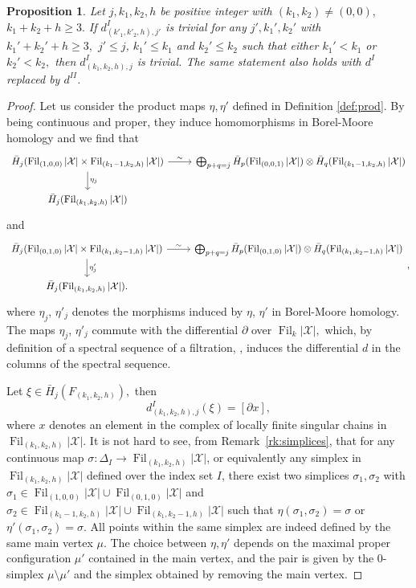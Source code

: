 \documentclass[10pt,a4paper,twoside]{amsart}
\theoremstyle{plain}
\newtheorem{prop}[theo]{Proposition}
\theoremstyle{definition}
\theoremstyle{remark}
\begin{document}
\begin{prop}\label{rkDiff2} 
Let $j,k_1,k_2,h$ be positive integer with $(k_1,k_2)\neq (0,0),$  $k_1+k_2+h\geq 3.$ 
If $d^{{I}}_{(k'_1,k'_2,h),j'}$ is trivial for any $j',k_1',k_2'$ with  $k_1'+k_2'+h\geq 3,$ $j'\leq j$,   $k_1'\leq k_1$ and $k_2'\leq k_2$ such that either $k_1'<k_1$ or $k_2'<k_2,$
then $d^{{I}}_{(k_1,k_2,h),j}$ is trivial.
The same statement also holds with $d^{{I}}$ replaced by $d^{{II}}$. 
\end{prop}
\begin{proof}
Let us consider the product maps $\eta,\eta'$ defined in Definition \ref{def:prod}. By being continuous and proper, they 
induce homomorphisms in Borel-Moore homology and we find that 
\[
\begin{tikzcd}
\bar{H}_{j}(\operatorname{Fil}_{{(1,0,0)}}|\mathcal{X}|\times \operatorname{Fil}_{{(k_1-1,k_2,h)}}|\mathcal{X}|)\arrow{d}{\eta_{j}}\arrow{r}{\sim}&\bigoplus_{p+q=j}\bar{H}_p(\operatorname{Fil}_{{(0,0,1)}}|\mathcal{X}|)\otimes\bar{H}_q(\operatorname{Fil}_{{(k_1-1,k_2,h)}}|\mathcal{X}|) \\
\bar{H}_{j}(\operatorname{Fil}_{{(k_1,k_2,h)}}|\mathcal{X}|)
\end{tikzcd}
\]
and
\[
\begin{tikzcd}
\bar{H}_{j}(\operatorname{Fil}_{{(0,1,0)}}|\mathcal{X}|\times \operatorname{Fil}_{{(k_1,k_2-1,h)}}|\mathcal{X}|)\arrow{d}{\eta'_{j}}\arrow{r}{\sim}&\bigoplus_{p+q=j}\bar{H}_p(\operatorname{Fil}_{{(0,1,0)}}|\mathcal{X}|)\otimes\bar{H}_q(\operatorname{Fil}_{{(k_1,k_2-1,h)}}|\mathcal{X}|) \\
\bar{H}_{j}(\operatorname{Fil}_{{(k_1,k_2,h)}}|\mathcal{X}|).
\end{tikzcd}, 
\]
where $\eta_j$, $\eta'_j$ denotes the morphisms induced by $\eta$, $\eta'$ in Borel-Moore homology. The maps $\eta_j$, $\eta'_j$ commute with the differential $\partial$ over $\operatorname{Fil}_k|\mathcal{X}|,$ which, by definition of a spectral sequence of a filtration, \cite[5.4]{Wei}, induces the differential $d$ in the columns of the spectral sequence.

Let $\xi\in\bar{H}_{{j}}(F_{(k_1,k_2,h)}),$ then 
$$d_{{(k_1,k_2,h),j}}^I(\xi)=\left[\partial x\right],$$ where $x$ denotes an element in the complex of locally finite singular chains in $\operatorname{Fil}_{(k_1,k_2,h)}|\mathcal{X}|$.
It is not hard to see, from Remark~\ref{rk:simplices}, 
that for any continuous map $\sigma:\Delta_I\to \operatorname{Fil}_{(k_1,k_2,h)}|\mathcal{X}|$, or equivalently any simplex in $\operatorname{Fil}_{(k_1,k_2,h)}|\mathcal{X}|$ defined over the index set $I$, there exist two simplices $\sigma_1,\sigma_2$ with $\sigma_1\in \operatorname{Fil}_{(1,0,0)}|\mathcal{X}|\cup\operatorname{Fil}_{(0,1,0)}|\mathcal{X}|$ and $\sigma_2\in\operatorname{Fil}_{(k_1-1,k_2,h)}|\mathcal{X}|\cup\operatorname{Fil}_{(k_1,k_2-1,h)}|\mathcal{X}|$ such that $\eta(\sigma_1,\sigma_2)=\sigma$ or $\eta'(\sigma_1,\sigma_2)=\sigma$. All points within the same simplex are indeed defined by the same main vertex $\mu$. The choice between $\eta, \eta'$ depends on the maximal proper configuration $\mu'$ contained in the main vertex, and the pair is given by the $0\mbox{-}$simplex $\mu\setminus\mu'$ and the simplex obtained by removing the main vertex.


\end{proof}
\end{document}
